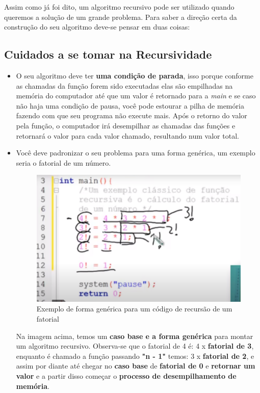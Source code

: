 \documentclass[
	12pt,				%
	oneside,   	        %
	a4paper,			%
	chapter=TITLE,		%
	section=TITLE,		%
	subsection=TITLE,	%
	subsubsection=TITLE,%
	english,			%
	french,				%
	spanish,			%
	brazil,				%
	]{pacotes/abntex2}
\begin{document}
Assim como já foi dito, um algoritmo recursivo pode ser utilizado quando queremos a solução de um grande problema. Para saber a direção certa da construção do seu algoritmo deve-se pensar em duas coisas: 

\subsection{\textbf{Cuidados a se tomar na Recursividade}}
\label{subsec:cuidados}

    \begin{itemize}
        \item O seu algoritmo deve ter \textbf{uma condição de parada}, isso porque conforme as chamadas da função forem sido executadas elas são empilhadas na memória do computador até que um valor é retornado para a \textit{main} e se caso não haja uma condição de pausa, você pode estourar a pilha de memória fazendo com que seu programa não execute mais.
        Após o retorno do valor pela função, o computador irá desempilhar as chamadas das funções e retornará o valor para cada valor chamado, resultando num valor total.
        \item Você deve padronizar o seu problema para uma forma genérica, um exemplo seria o fatorial de um número.
        
            \begin{figure}[H]
             \centering
             \includegraphics[scale=0.5]{Figuras/rec-fatorial.png}
             \caption{Exemplo de forma genérica para um código de recursão de um fatorial \cite{imagem2}}
             \label{fig:partições}
            \end{figure}
            
        Na imagem acima, temos um \textbf{caso base e a forma genérica} para montar um algoritmo recursivo. Observa-se que o fatorial de 4 é: 4 x \textbf{fatorial de 3}, enquanto é chamado a função passando \textbf{"n - 1"} temos: 3 x \textbf{fatorial de 2}, e assim por diante até chegar no \textbf{caso base} de \textbf{fatorial de 0} e \textbf{retornar um valor} e a partir disso começar o \textbf{processo de desempilhamento de memória}.
        

\end{itemize}
\end{document}
